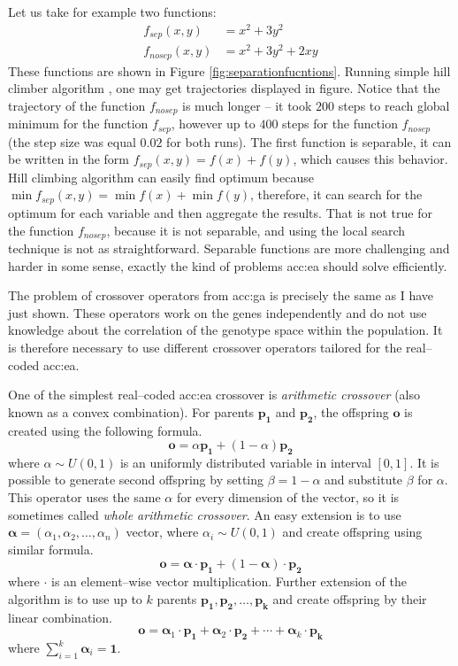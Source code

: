 Let us take for example two functions:
\begin{align*}
    f_{sep}(x,y)&=x^2+3y^2 \\
    f_{nosep}(x,y)&=x^2+3y^2+2xy
\end{align*}
These functions are shown in Figure \ref{fig:separationfucntions}. Running simple hill climber algorithm \citep{HandbookOfMetaheuristics}, one may get trajectories displayed in figure. Notice that the trajectory of the function $f_{nosep}$ is much longer -- it took $200$ steps to reach global minimum for the function $f_{sep}$, however up to $400$ steps for the function $f_{nosep}$ (the step size was equal $0.02$ for both runs). The first function is separable, it can be written in the form $f_{sep}(x,y)=f(x)+f(y)$, which causes this behavior. Hill climbing algorithm can easily find optimum because $\min f_{sep}(x,y)=\min f(x)+\min f(y)$, therefore, it can search for the optimum for each variable and then aggregate the results. That is not true for the function $f_{nosep}$, because it is not separable, and using the local search technique is not as straightforward. Separable functions are more challenging and harder in some sense, exactly the kind of problems \acrshort{acc:ea} should solve efficiently.

The problem of crossover operators from \acrshort{acc:ga} is precisely the same as I have just shown. These operators work on the genes independently and do not use knowledge about the correlation of the genotype space within the population. It is therefore necessary to use different crossover operators tailored for the real--coded \acrshort{acc:ea}.

One of the simplest real--coded \acrshort{acc:ea} crossover is \emph{arithmetic crossover} (also known as a convex combination). For parents $\mathbf{p_1}$ and $\mathbf{p_2}$, the offspring $\mathbf{o}$ is created using the following formula.
$$
\mathbf{o} = \alpha\mathbf{p_1}+\left(1-\alpha\right)\mathbf{p_2}
$$
where $\alpha \sim U(0,1)$ is an uniformly distributed variable in interval $\left[0,1\right]$. It is possible to generate second offspring by setting $\beta=1-\alpha$ and substitute $\beta$ for $\alpha$. This operator uses the same $\alpha$ for every dimension of the vector, so it is sometimes called \emph{whole arithmetic crossover}. An easy extension is to use $\boldsymbol{\alpha}=(\alpha_1,\alpha_2,\dots,\alpha_n)$ vector, where $\alpha_i\sim U(0,1)$ and create offspring using similar formula.
$$
\mathbf{o} = \boldsymbol{\alpha}\cdot\mathbf{p_1}+\left(1-\boldsymbol{\alpha}\right)\cdot\mathbf{p_2}
$$
where $\cdot$ is an element--wise vector multiplication.
Further extension of the algorithm is to use up to $k$ parents $\mathbf{p_1}, \mathbf{p_2},\dots,\mathbf{p_k}$ and create offspring by their linear combination.
$$
\mathbf{o} = 
\boldsymbol{\alpha}_1\cdot\mathbf{p_1}+
\boldsymbol{\alpha}_2\cdot\mathbf{p_2}+
\cdots +
\boldsymbol{\alpha}_k\cdot\mathbf{p_k}
$$
where $\sum_{i=1}^{k}\boldsymbol{\alpha}_i=\boldsymbol{1}$.

